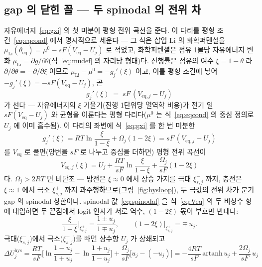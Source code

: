 \documentclass[11pt,a4paper]{article}
\newcommand{\eq}{\mathrm{eq}}
\newcommand{\hys}{\mathrm{hys}}
\begin{document}
\subsection{gap 의 닫힌 꼴 — 두 spinodal 의 전위 차}
자유에너지~\eqref{eq:gxi} 의 첫 미분이 평형 전위 곡선을 준다. 이 다리를 평형 조건~\eqref{eq:eqcond} 에서 명시적으로
세운다 --- 그 식은 삽입 Li 의 화학퍼텐셜을 $\mu_\mathrm{Li}(\theta_\eq)=\mu^0-sF(V_\eq-U_j)$ 로 적었고, 화학퍼텐셜은
점유 1몰당 자유에너지 변화 $\mu_\mathrm{Li}=\partial g/\partial\theta$(식~\eqref{eq:mudef} 의 자리당 형태)다. 진행률은
점유의 여수 $\xi=1-\theta$ 라 $\partial/\partial\theta=-\partial/\partial\xi$ 이므로 $\mu_\mathrm{Li}-\mu^0=-g_j'(\xi)$ 이고,
이를 평형 조건에 넣어 $-g_j'(\xi)=-sF(V_\eq-U_j)$, 곧
\begin{equation}
g_j'(\xi)\;=\;sF\,(V_{\eq,j}-U_j)
\label{eq:gveqbridge}
\end{equation}
가 선다 --- 자유에너지의 $\xi$ 기울기(진행 1단위당 열역학 비용)가 전기 일 $sF(V_\eq-U_j)$ 와 균형을 이룬다는 평형
다리다($\mu^0$ 는 식~\eqref{eq:eqcond} 의 중심 정의로 $U_j$ 에 이미 흡수됨). 이 다리의 좌변에 식~\eqref{eq:gxi} 를
한 번 미분한
\begin{equation}
g_j'(\xi)=RT\ln\frac{\xi}{1-\xi}+\Omega_j(1-2\xi)=sF\,(V_{\eq,j}-U_j)
\label{eq:gprime}
\end{equation}
를 $V_\eq$ 로 풀면(양변을 $sF$ 로 나누고 중심을 더하면) 평형 전위 곡선이
\begin{equation}
V_{\eq,j}(\xi)=U_j+\frac{RT}{sF}\ln\frac{\xi}{1-\xi}+\frac{\Omega_j}{sF}(1-2\xi)
\label{eq:Veq}
\end{equation}
다. $\Omega_j>2RT$ 면 비단조 --- 방전은 $\xi\!\approx\!0$ 에서 상승 가지를 극대 $\xi_{s,j}^-$ 까지, 충전은 $\xi\!\approx\!1$
에서 극소 $\xi_{s,j}^+$ 까지 과주행하므로(그림~\ref{fig:hysloop}), 두 극값의 전위 차가 분기 gap 의 spinodal 상한이다.
spinodal 값~\eqref{eq:spinodal} 을 식~\eqref{eq:Veq} 의 두 비상수 항에 대입하면 두 끝점에서 logit 인자가 서로 역수,
$(1-2\xi)$ 몫이 부호만 반대다:
\begin{equation}
\frac{\xi}{1-\xi}\bigg|_{\xi_{s,j}^\pm}=\frac{1\pm u_j}{1\mp u_j},
\qquad
(1-2\xi)\big|_{\xi_{s,j}^\pm}=\mp\,u_j.
\label{eq:hyssub}
\end{equation}
극대($\xi_{s,j}^-$)에서 극소($\xi_{s,j}^+$)를 빼면 상수항 $U_j$ 가 상쇄되고
\begin{equation}
\Delta U_j^\hys
=\frac{RT}{sF}\Big[\ln\frac{1-u_j}{1+u_j}-\ln\frac{1+u_j}{1-u_j}\Big]
+\frac{\Omega_j}{sF}\big[u_j-(-u_j)\big]
=-\frac{4RT}{sF}\,\mathrm{artanh}\,u_j+\frac{2\Omega_j}{sF}\,u_j
\label{eq:hysdiff}
\end{equation}
\end{document}
